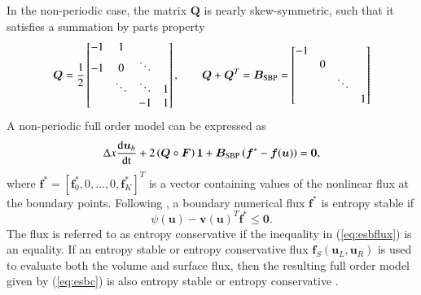 \documentclass[preprint,10pt]{elsarticle}
\theoremstyle{definition}
\theoremstyle{lemma}
\theoremstyle{theorem}
\theoremstyle{assumption}
\newcommand{\td}[2]{\frac{{\rm d}#1}{{\rm d}{\rm #2}}}
\newcommand{\LRp}[1]{\left( #1 \right)}
\newcommand{\LRs}[1]{\left[ #1 \right]}
\begin{document}
In the non-periodic case, the matrix $\bm{Q}$ is nearly skew-symmetric, such that it satisfies a summation by parts property
\begin{equation}
\bm{Q} = \frac{1}{2}\begin{bmatrix}
-1 & 1 & & \\
-1 & 0 & \ddots &\\
 &\ddots &\ddots &1\\
  & & -1 &1\\
\end{bmatrix}, \qquad \bm{Q} + \bm{Q}^T = \bm{B}_{\rm SBP} = 
\begin{bmatrix}
-1& && \\
&0 &&\\
& &\ddots &\\
& &&1\\
\end{bmatrix}
\label{eq:fomsbp}
\end{equation}
A non-periodic full order model can be expressed as 
\begin{align}
\Delta x \td{\bm{u}_h}{t} + 2\LRp{{\bm{Q}}\circ \bm{F}}\bm{1} + \bm{B}_{\rm SBP}\LRp{\bm{f}^* - \bm{f}(\bm{u})} = \bm{0},
\label{eq:esbc}
\end{align}
where $\bm{f}^* = \LRs{\bm{f}^*_0, 0,\ldots, 0, \bm{f}^*_K}^T$ is a vector containing values of the nonlinear flux at the boundary points.  
Following \cite{chen2017entropy}, a boundary numerical flux $\bm{f}^*$ is entropy stable if 
\begin{equation}
\psi\LRp{\bm{u}} - \bm{v}(\bm{u})^T\bm{f}^* \leq \bm{0}.%
\label{eq:esbflux}
\end{equation}
The flux is referred to as entropy conservative if the inequality in (\ref{eq:esbflux}) is an equality.  If an entropy stable or entropy conservative flux $\bm{f}_S(\bm{u}_L,\bm{u}_R)$ is used to evaluate both the volume and surface flux, then the resulting full order model given by (\ref{eq:esbc}) is also entropy stable or entropy conservative \cite{tadmor1987numerical, parsani2015entropy, chen2017entropy}.  
\end{document}
